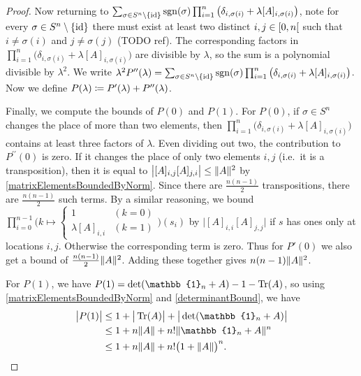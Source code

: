 \begin{proof}
Now returning to $\sum_{\sigma\in S^n\setminus\{\operatorname{id}\}}\operatorname{sgn}(\sigma)\prod_{i=1}^n\big(\delta_{i,\sigma(i)} + \lambda [A]_{i,\sigma(i)}\big)$, note for every $\sigma\in S^n\setminus\{\operatorname{id}\}$ there must exist at least two distinct $i,j\in \interval[co]{0,n}$ such that $i\neq \sigma(i)$ and $j\neq \sigma(j)$ (TODO ref). The corresponding factors in $\prod_{i=1}^n\big(\delta_{i,\sigma(i)} + \lambda [A]_{i,\sigma(i)}\big)$ are divisible by $\lambda$, so the sum is a polynomial divisible by $\lambda^2$. We write $\lambda^2P^{\prime\prime}(\lambda) = \sum_{\sigma\in S^n\setminus\{\operatorname{id}\}}\operatorname{sgn}(\sigma)\prod_{i=1}^n\big(\delta_{i,\sigma(i)} + \lambda [A]_{i,\sigma(i)}\big)$. Now we define $P(\lambda) \coloneqq P'(\lambda) + P^{\prime\prime}(\lambda)$.

Finally, we compute the bounds of $P(0)$ and $P(1)$. For $P(0)$, if $\sigma\in S^n$ changes the place of more than two elements, then $\prod_{i=1}^n\big(\delta_{i,\sigma(i)} + \lambda [A]_{i,\sigma(i)}\big)$ contains at least three factors of $\lambda$. Even dividing out two, the contribution to $P^{\prime\prime}(0)$ is zero. If it changes the place of only two elements $i,j$ (i.e.\ it is a transposition), then it is equal to $\big|[A]_{i,j}[A]_{j,i}\big| \leq \lVert A\rVert^2$ by \ref{matrixElementsBoundedByNorm}. Since there are $\frac{n(n-1)}{2}$ transpositions, there are $\frac{n(n-1)}{2}$ such terms. By a similar reasoning, we bound $\prod_{i=0}^{n-1}\Big(k\mapsto \begin{cases}
1 & (k=0) \\ \lambda[A]_{i,i} & (k=1)
\end{cases}\Big)(s_i)$ by $\big|[A]_{i,i}[A]_{j,j}\big|$ if $s$ has ones only at locations $i,j$. Otherwise the corresponding term is zero. Thus for $P'(0)$ we also get a bound of $\frac{n(n-1)}{2}\lVert A\rVert^2$. Adding these together gives $n(n-1)\lVert A\rVert^2$.

For $P(1)$, we have $P(1) = \det(\mathbb{1}_n + A) - 1 - \Tr(A)$, so using \ref{matrixElementsBoundedByNorm} and \ref{determinantBound}, we have
\begin{align*}
\big|P(1)\big| &\leq 1 + \big|\Tr(A)\big| + \big|\det(\mathbb{1}_n + A)\big| \\
&\leq 1 + n\norm{A} + n!\norm{\mathbb{1}_n + A}^n \\
&\leq 1 + n\norm{A} + n!\big(1 + \norm{A}\big)^n.
\end{align*}
\end{proof}

